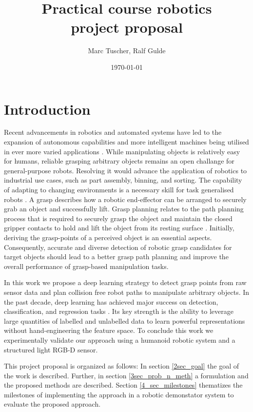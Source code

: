 \documentclass[a4paper]{article}
\title{Practical course robotics \\ project proposal}
\author{Marc Tuscher, Ralf Gulde}
\date{\today}
\begin{document}
\maketitle

\section{Introduction}
Recent advancements in robotics and automated systems have led to the expansion of autonomous capabilities and more intelligent machines being utilised in ever more varied applications \cite{1Visual_learning_2005, 2Teleoperation:2014}.
While manipulating objects is relatively easy for humans, reliable grasping arbitrary objects remains an open challange for general-purpose robots.
Resolving it would advance the application of robotics to industrial use cases, such as part assembly, binning, and sorting.
The capability of adapting to changing environments is a necessary skill for task generalised robots \cite{3Robot_learning_2012, 4Imitation_and_Reinforcement_Learning_2010}.
A grasp describes how a robotic end-effector can be arranged to securely grab an object and successfully lift.
Grasp planning relates to the path planning process that is required to securely grasp the object and maintain the closed gripper contacts to hold and lift the object from its resting surface \cite{5Robotic_grasping_and_contact}.
Initially, deriving the grasp-points of a perceived object is an essential aspects.
Consequently, accurate and diverse detection of robotic grasp candidates for target objects should lead to a better grasp path planning and improve the overall performance of grasp-based manipulation tasks.

In this work we propose a deep learning strategy to detect grasp points from raw sensor data and plan collision free robot paths to manipulate arbitrary objects.
In the past decade, deep learning has achieved major success on detection, classification, and regression tasks \cite{6bo2013unsupervised, 7krizhevsky2012imagenet}. 
Its key strength is the ability to leverage large quantities of labelled and unlabelled data to learn powerful representations without hand-engineering the feature space.
To conclude this work we experimentally validate our approach using a humanoid robotic system and a structured light RGB-D sensor.

This project proposal is organized as follows: In section \ref{2sec_goal} the goal of the work is described. 
Further, in section \ref{3sec_prob_n_meth} a formulation and the proposed methods are described.
Section \ref{4_sec_milestones} thematizes the milestones of implementing the approach in a robotic demonstator system to evaluate the proposed approach.
\end{document}
